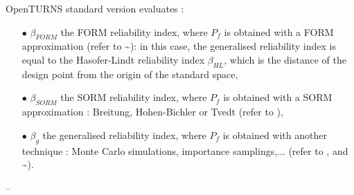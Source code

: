 {  OpenTURNS standard version  evaluates :
  \begin{itemize}
  \item[$\bullet$] $\beta_{FORM}$ the FORM reliability index, where $P_f$ is obtained with a FORM approximation (refer to \textasciitilde): in this case, the generalised reliability index is equal to the Hasofer-Lindt reliability index $\beta_{HL}$, which is the distance of the design point from the origin of the standard space,
  \item[$\bullet$] $\beta_{SORM}$ the SORM reliability index, where $P_f$ is obtained with a SORM approximation : Breitung, Hohen-Bichler or Tvedt (refer to ),
  \item[$\bullet$] $\beta_g$ the generalised reliability index, where $P_f$ is obtained with another technique : Monte Carlo simulations, importance samplings,... (refer to ,  and \textasciitilde).
  \end{itemize}
}
{
  --}


